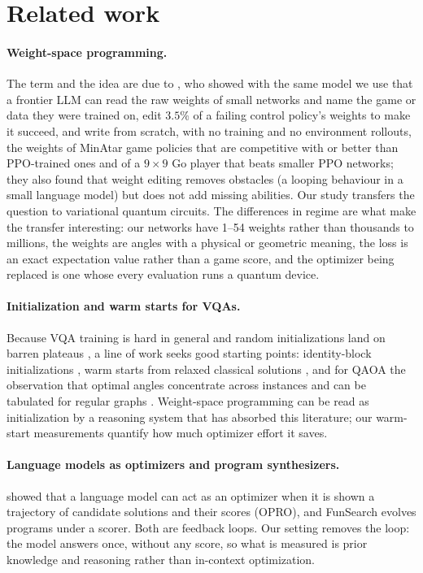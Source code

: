 \section{Related work}
\label{sec:related}

\paragraph{Weight-space programming.}
The term and the idea are due to \citet{takehi2026sparks}, who showed with the same model we use that a frontier LLM can read the raw weights of small networks and name the game or data they were trained on, edit $3.5\%$ of a failing control policy's weights to make it succeed, and write from scratch, with no training and no environment rollouts, the weights of MinAtar game policies that are competitive with or better than PPO-trained ones and of a $9{\times}9$ Go player that beats smaller PPO networks; they also found that weight editing removes obstacles (a looping behaviour in a small language model) but does not add missing abilities. Our study transfers the question to variational quantum circuits. The differences in regime are what make the transfer interesting: our networks have 1--54 weights rather than thousands to millions, the weights are angles with a physical or geometric meaning, the loss is an exact expectation value rather than a game score, and the optimizer being replaced is one whose every evaluation runs a quantum device.

\paragraph{Initialization and warm starts for VQAs.}
Because VQA training is hard in general \citep{bittel2021training} and random initializations land on barren plateaus \citep{mcclean2018barren}, a line of work seeks good starting points: identity-block initializations \citep{grant2019initialization}, warm starts from relaxed classical solutions \citep{egger2021warm}, and for QAOA the observation that optimal angles concentrate across instances \citep{brandao2018fixed,zhou2020quantum} and can be tabulated for regular graphs \citep{wurtz2021fixed}. Weight-space programming can be read as initialization by a reasoning system that has absorbed this literature; our warm-start measurements quantify how much optimizer effort it saves.

\paragraph{Language models as optimizers and program synthesizers.}
\citet{yang2024large} showed that a language model can act as an optimizer when it is shown a trajectory of candidate solutions and their scores (OPRO), and FunSearch \citep{romera2024mathematical} evolves programs under a scorer. Both are feedback loops. Our setting removes the loop: the model answers once, without any score, so what is measured is prior knowledge and reasoning rather than in-context optimization.

